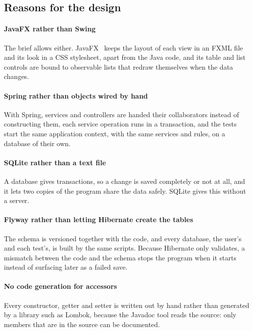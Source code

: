 \subsection{Reasons for the design}

\paragraph*{JavaFX rather than Swing} The brief allows either. JavaFX~\cite{openjfx} keeps the layout of each view in an FXML file
and its look in a CSS stylesheet, apart from the Java code, and its table and list controls are bound to observable
lists that redraw themselves when the data changes.

\paragraph*{Spring rather than objects wired by hand} With Spring, services and controllers are handed their
collaborators instead of constructing them, each service operation runs in a transaction, and the tests start the
same application context, with the same services and rules, on a database of their own.

\paragraph*{SQLite rather than a text file} A database gives transactions, so a change is saved completely or not at
all, and it lets two copies of the program share the data safely. SQLite gives this without a server.

\paragraph*{Flyway rather than letting Hibernate create the tables} The schema is versioned together with the code,
and every database, the user's and each test's, is built by the same scripts. Because Hibernate only validates, a
mismatch between the code and the schema stops the program when it starts instead of surfacing later as a failed
save.

\paragraph*{No code generation for accessors} Every constructor, getter and setter is written out by hand rather than
generated by a library such as Lombok, because the Javadoc tool reads the source: only members that are in the source
can be documented.
